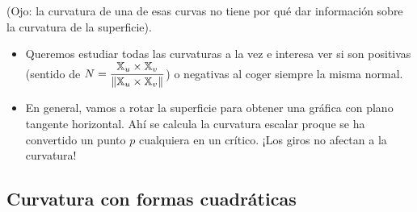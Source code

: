 (Ojo: la curvatura de una de esas curvas no tiene por qué dar información sobre la curvatura de la superficie).

\begin{itemize}
	\item Queremos estudiar todas las curvaturas a la vez e interesa ver si son positivas (sentido de $\displaystyle N=\frac{\mathbb{X}_u\times\mathbb{X}_v}{\left\Vert\mathbb{X}_u\times\mathbb{X}_v\right\Vert}$) o negativas al coger siempre la misma normal.
	\item En general, vamos a rotar la superficie para obtener una gráfica con plano tangente horizontal. Ahí se calcula la curvatura escalar proque se ha convertido un punto $p$ cualquiera en un crítico. ¡Los giros no afectan a la curvatura!
\end{itemize}

\subsection{Curvatura con formas cuadráticas}

